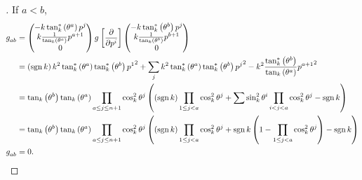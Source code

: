 \documentclass[../main.tex]{subfiles}
\begin{document}
\begin{proof}[]
    If $a<b$,
    \begin{align*}
        \tensor{g}{_a_b}
         & =\begin{pmatrix}
                -k\tan_k^\ast\left(\tensor{\theta}{^a}\right)\tensor{p}{^j}         \\
                k\frac{1}{\tan_k\left(\tensor{\theta}{^a}\right)}\tensor{p}{^{a+1}} \\
                0                                                                   \\
            \end{pmatrix}
        \tensor{g}{}\left[\frac{\partial}{\partial\tensor{p}{^i}}\right]
        \begin{pmatrix}
            -k\tan_k^\ast\left(\tensor{\theta}{^b}\right)\tensor{p}{^j}         \\
            k\frac{1}{\tan_k\left(\tensor{\theta}{^b}\right)}\tensor{p}{^{b+1}} \\
            0                                                                   \\
        \end{pmatrix}                         \\
         & =
        \left(\sign{k}\right) k^2\tan_k^\ast\left(\tensor{\theta}{^a}\right)\tan_k^\ast\left(\tensor{\theta}{^b}\right){\tensor{p}{^1}}^2
        +
        \sum_j{
            k^2\tan_k^\ast\left(\tensor{\theta}{^a}\right)\tan_k^\ast\left(\tensor{\theta}{^b}\right){\tensor{p}{^j}}^2
        }
        -k^2\frac{\tan_k^\ast\left(\tensor{\theta}{^b}\right)}{\tan_k\left(\tensor{\theta}{^a}\right)}{\tensor{p}{^{a+1}}}^2 \\
         & =
        \tan_k\left(\tensor{\theta}{^b}\right)
        \tan_k\left(\tensor{\theta}{^a}\right)
        \prod_{a\le j\le n+1}{\cos_k^2\tensor{\theta}{^j}}
        \left(
        \left(\sign{k}\right)
        \prod_{1\le j<a}{\cos_k^2\tensor{\theta}{^j}}
        + \sum{
            \sin_k^2{\tensor{\theta}{^{i}}}\prod_{i<j<a}{\cos_k^2\tensor{\theta}{^j}}
        }
        -\sign{k}
        \right)                                                                                                              \\
         & =
        \tan_k\left(\tensor{\theta}{^b}\right)
        \tan_k\left(\tensor{\theta}{^a}\right)
        \prod_{a\le j\le n+1}{\cos_k^2\tensor{\theta}{^j}}
        \left(
        \left(\sign{k}\right)
        \prod_{1\le j<a}{\cos_k^2\tensor{\theta}{^j}}
        + \sign{k}\left(
        1-\prod_{1\le j<a}{\cos_k^2\tensor{\theta}{^j}}
        \right)
        - \sign{k}
        \right)                                                                                                              \\
        \tensor{g}{_a_b}
         & = 0 \text{.}
    \end{align*}


\end{proof}
\end{document}
